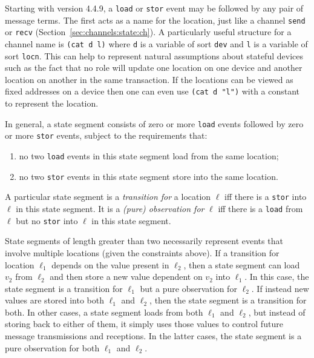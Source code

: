 Starting with {\cpsa} version 4.4.9, a \verb|load| or \verb|stor|
event may be followed by any pair of message terms. The first acts as
a name for the location, just like a channel \verb|send| or
\verb|recv| (Section~\ref{sec:channels:state:ch}). A particularly
useful structure for a channel name is \verb|(cat d l)| where \verb|d|
is a variable of sort \verb|dev| and \verb|l| is a variable of sort
\verb|locn|. This can help to represent natural assumptions about
stateful devices such as the fact that no role will update one
location on one device and another location on another in the same
transaction. If the locations can be viewed as fixed addresses on a
device then one can even use \verb|(cat d "l")| with a constant to
represent the location. 



In general, a state segment consists of zero or more \verb|load|
events followed by zero or more \verb|stor| events, subject to the
requirements that:
%
\begin{enumerate}
  \item no two \verb|load| events in this state segment load from the
  same location;
  \item no two \verb|stor| events in this state segment store into the
  same location.
\end{enumerate}
%
A particular state segment is a \emph{transition for} a location
$\ell$ iff there is a \verb|stor| into $\ell$ in this state segment.
It is a \emph{(pure) observation for} $\ell$ iff there is a
\verb|load| from $\ell$ but no \verb|stor| into $\ell$ in this state
segment.

State segments of length greater than two necessarily represent events
that involve multiple locations (given the constraints above).  If a
transition for location $\ell_1$ depends on the value present in
$\ell_2$, then a state segment can load $v_2$ from $\ell_2$ and then
store a new value dependent on $v_2$ into $\ell_1$.  In this case, the
state segment is a transition for $\ell_1$ but a pure observation for
$\ell_2$.  If instead new values are stored into both $\ell_1$ and
$\ell_2$, then the state segment is a transition for both.  In other
cases, a state segment loads from both $\ell_1$ and $\ell_2$, but
instead of storing back to either of them, it simply uses those values
to control future message transmissions and receptions.  In the latter
cases, the state segment is a pure observation for both $\ell_1$ and
$\ell_2$.

